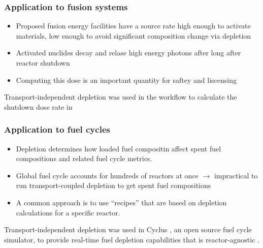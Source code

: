 \begin{frame}
    \frametitle{Application to fusion systems}
    \begin{itemize}
        \item Proposed fusion energy facilities have a source rate high enough
            to activate materials, low enough to avoid significant composition
            change via depletion
        \item Activated nuclides decay and relase high energy photons after
            long after reactor shutdown
        \item Computing this dose is an important quantity for saftey and
            liscensing 
    \end{itemize}
    Transport-independent depletion was used in the workflow to
    calculate the shutdown dose rate in \cite{peterson_development_2024}
    
\end{frame}

\begin{frame}
    \frametitle{Application to fuel cycles}
    \begin{itemize}
        \item Depletion determines how loaded fuel compositin affect spent fuel
            compositions and related fuel cycle metrics.
        \item Global fuel cycle accounts for hundreds of reactors at once
            $\rightarrow$ impractical to run transport-coupled depletion to get
            spent fuel compositions
        \item A common approach is to use ``recipes'' that are based on
            depletion calculations for a specific reactor.
    \end{itemize}
    Transport-independent depletion was used in Cyclus
    \cite{huff_fundamental_2016}, an open source fuel cycle simulator, to
    provide real-time fuel depletion capabilities that is reactor-agnostic
    \cite{bachmann_open-source_2024}.
    
\end{frame}
